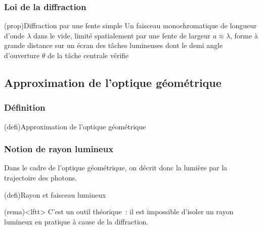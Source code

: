 \documentclass[../../main/main.tex]{subfiles}
\begin{document}
\subsubsection{Loi de la diffraction}

\begin{tcb*}[label=prop:loidiff](prop){Diffraction par une fente simple}
	Un faisceau monochromatique de longueur d'onde $\lambda$ dans le vide,
	limité spatialement par une fente de largeur $a \approx \lambda$, forme à
	grande distance sur un écran des tâches lumineuses dont le demi angle
	d'ouverture $\theta$ de la tâche centrale vérifie
	\psw{%
		\[
			\boxed{\sin(\theta) = \frac{\lambda}{a}}
		\]
	}%
	\vspace*{-10pt}
\end{tcb*}

\subsection{Approximation de l'optique géométrique}

\subsubsection{Définition}

\begin{tcb*}[label=def:optgeo,
		list entry={\lte Approxima$^\circ$ de l'optiq.\ géométrique}
	](defi){Approximation de l'optique géométrique}
\end{tcb*}

\subsubsection{Notion de rayon lumineux}

Dans le cadre de l'optique géométrique, on décrit donc la lumière par la
trajectoire des photons.

\begin{tcb*}[cnt, bld, label=def:rl](defi){Rayon et faisceau lumineux}
\end{tcb*}
\begin{tcb}(rema)<lftt>{}
	C'est un outil théorique~: il est impossible d'isoler un rayon lumineux
	en pratique à cause de la diffraction.
\end{tcb}
\end{document}
